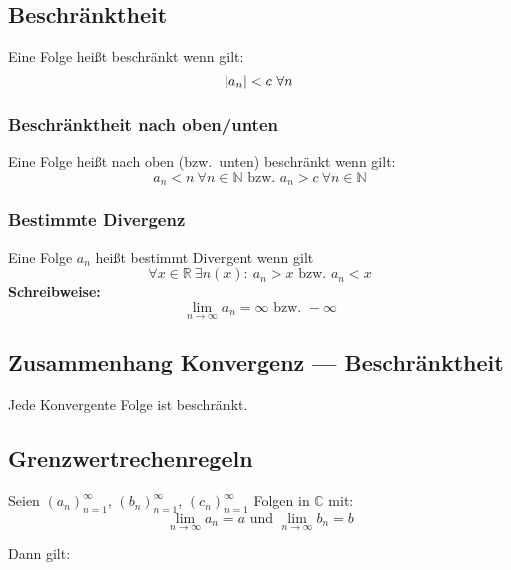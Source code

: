 \documentclass[12pt]{article}
\begin{document}
    \subsection{Beschränktheit}
    Eine Folge heißt beschränkt wenn gilt:
    \begin{equation*}
        \abs{a_n} < c\ \forall n
    \end{equation*}

    \subsubsection{Beschränktheit nach oben/unten}
    Eine Folge heißt nach oben (bzw.~unten) beschränkt wenn gilt:
    \begin{equation*}
        a_n < n\ \forall n \in \mathbb{N} \text{ bzw. }a_n > c\ \forall n \in \mathbb{N}
    \end{equation*}

    \subsubsection{Bestimmte Divergenz}
    Eine Folge $a_n$ heißt bestimmt Divergent wenn gilt
    \begin{equation*}
        \forall x \in \mathbb{R}\ \exists n(x):\ a_n>x \text{ bzw. } a_n<x
    \end{equation*}
    \textbf{Schreibweise:}
    \begin{equation*}
        \lim_{n \rightarrow \infty} a_n = \infty \text{ bzw. } -\infty
    \end{equation*}

    \subsection{Zusammenhang Konvergenz --- Beschränktheit}
    Jede Konvergente Folge ist beschränkt.

    \subsection{Grenzwertrechenregeln}
    Seien ${(a_n)}_{n=1}^\infty$, ${(b_n)}_{n=1}^\infty$, ${(c_n)}_{n=1}^\infty$ Folgen
    in $\mathbb{C}$ mit:
    \begin{equation*}
        \lim_{n \rightarrow \infty} a_n = a \text{ und }
        \lim_{n \rightarrow \infty} b_n = b
    \end{equation*}

    Dann gilt:
\end{document}
